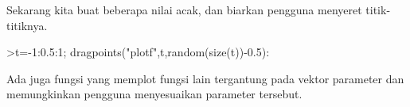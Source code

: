 \documentclass[a4paper,10pt]{article}
\begin{document}
\begin{eulernotebook}
\begin{eulercomment}
\begin{eulercomment}
\begin{eulercomment}
\begin{eulercomment}
\begin{eulercomment}
\begin{eulercomment}
\begin{eulercomment}
\begin{eulercomment}
\begin{eulercomment}
\begin{eulercomment}
\begin{eulercomment}
\begin{eulercomment}
\begin{eulercomment}
Sekarang kita buat beberapa nilai acak, dan biarkan pengguna menyeret
titik-titiknya.
\end{eulercomment}
\begin{eulerprompt}
>t=-1:0.5:1; dragpoints("plotf",t,random(size(t))-0.5):
\end{eulerprompt}
\begin{eulercomment}
Ada juga fungsi yang memplot fungsi lain tergantung pada vektor
parameter dan memungkinkan pengguna menyesuaikan parameter tersebut.


\end{eulercomment}
\end{eulercomment}
\end{eulercomment}
\end{eulercomment}
\end{eulercomment}
\end{eulercomment}
\end{eulercomment}
\end{eulercomment}
\end{eulercomment}
\end{eulercomment}
\end{eulercomment}
\end{eulercomment}
\end{eulercomment}
\end{eulernotebook}
\end{document}
